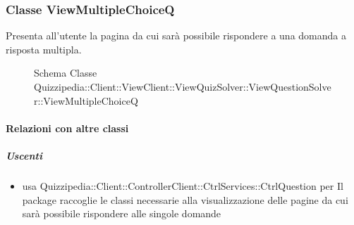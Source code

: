 \subsubsection{Classe ViewMultipleChoiceQ}
Presenta all'utente la pagina da cui sarà possibile rispondere a una domanda a risposta multipla.
\begin{figure}[H]
\centering
\noindent{}
\caption[Schema Classe ViewMultipleChoiceQ]{Schema Classe Quizzipedia::Client::ViewClient::ViewQuizSolver::ViewQuestionSolver::ViewMultipleChoiceQ}
\end{figure}
\paragraph{Relazioni con altre classi}
\subparagraph{Uscenti}
\begin{itemize}
\item usa Quizzipedia::Client::ControllerClient::CtrlServices::CtrlQuestion per Il package raccoglie le classi necessarie alla visualizzazione delle pagine da cui sarà possibile rispondere alle singole domande
\end{itemize}

